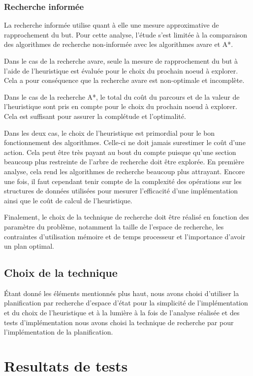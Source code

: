 \documentclass[12pt,english,frenchb,letterpaper]{article}
\begin{document}
\subsubsection{Recherche informée}
La recherche informée utilise quant à elle une mesure approximative de rapprochement du but. Pour cette analyse, l'étude s'est limitée à la comparaison des algorithmes de recherche non-informée avec les algorithmes avare et A*.

Dans le cas de la recherche avare, seule la mesure de rapprochement du but à l'aide de l'heuristique est évaluée pour le choix du prochain noeud à explorer.  Cela a pour conséquence que la recherche avare est non-optimale et incomplète.

Dans le cas de la recherche A*, le total du coût du parcours et de la valeur de l'heuristique sont pris en compte pour le choix du prochain noeud à explorer.  Cela est suffisant pour assurer la complétude et l'optimalité.

Dans les deux cas, le choix de l'heuristique est primordial pour le bon fonctionnement des algorithmes.  Celle-ci ne doit jamais surestimer le coût d'une action.  Cela peut être très payant au bout du compte puisque qu'une section beaucoup plus restreinte de l'arbre de recherche doit être explorée.  En première analyse, cela rend les algorithmes de recherche beaucoup plus attrayant.  Encore une fois, il faut cependant tenir compte de la complexité des opérations sur les structures de données utilisées pour mesurer l'efficacité d'une implémentation ainsi que le coût de calcul de l'heuristique.  

Finalement, le choix de la technique de recherche doit être réalisé en fonction des paramètre du problème, notamment la taille de l'espace de recherche, les contraintes d'utilisation mémoire et de temps processeur et l'importance d'avoir un plan optimal. 


\subsection{Choix de la technique}

Étant donné les éléments mentionnés plus haut, nous avons choisi d'utiliser la planification par recherche d'espace d'état pour la simplicité de l'implémentation et du choix de l'heuristique et à la lumière à la fois de l'analyse réalisée et des tests d'implémentation nous avons choisi la technique de recherche par %
pour l'implémentation de la planification.

\section{Resultats de tests}
\end{document}
